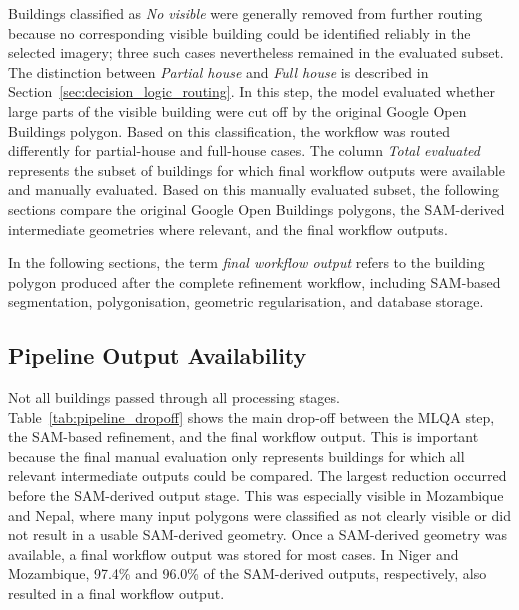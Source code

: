 Buildings classified as \textit{No visible} were generally removed from further routing because no corresponding visible building could be identified reliably in the selected imagery; three such cases nevertheless remained in the evaluated subset. The distinction between \textit{Partial house} and \textit{Full house} is described in Section~\ref{sec:decision_logic_routing}. In this step, the model evaluated whether large parts of the visible building were cut off by the original Google Open Buildings polygon. Based on this classification, the workflow was routed differently for partial-house and full-house cases. The column \textit{Total evaluated} represents the subset of buildings for which final workflow outputs were available and manually evaluated.
Based on this manually evaluated subset, the following sections compare the original Google Open Buildings polygons, the SAM-derived intermediate geometries where relevant, and the final workflow outputs.

In the following sections, the term \textit{final workflow output} refers to the building polygon produced after the complete refinement workflow, including SAM-based segmentation, polygonisation, geometric regularisation, and database storage.

\subsection{Pipeline Output Availability}

Not all buildings passed through all processing stages. Table~\ref{tab:pipeline_dropoff} shows the main drop-off between the MLQA step, the SAM-based refinement, and the final workflow output. This is important because the final manual evaluation only represents buildings for which all relevant intermediate outputs could be compared. The largest reduction occurred before the SAM-derived output stage. This was especially visible in Mozambique and Nepal, where many input polygons were classified as not clearly visible or did not result in a usable SAM-derived geometry. Once a SAM-derived geometry was available, a final workflow output was stored for most cases. In Niger and Mozambique, 97.4\% and 96.0\% of the SAM-derived outputs, respectively, also resulted in a final workflow output.

